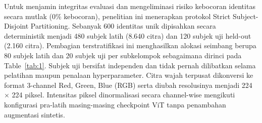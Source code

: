 Untuk menjamin integritas evaluasi dan mengeliminasi risiko kebocoran identitas secara mutlak (0\% kebocoran), penelitian ini menerapkan protokol Strict Subject-Disjoint Partitioning. Sebanyak 600 identitas unik dipisahkan secara deterministik menjadi 480 subjek latih (8.640 citra) dan 120 subjek uji held-out (2.160 citra). Pembagian terstratifikasi ini menghasilkan alokasi seimbang berupa 80 subjek latih dan 20 subjek uji per subkelompok sebagaimana dirinci pada Table~\ref{tab:1}. Subjek uji bersifat independen dan tidak pernah dilibatkan selama pelatihan maupun penalaan hyperparameter. Citra wajah terpusat dikonversi ke format 3-channel Red, Green, Blue (RGB) serta diubah resolusinya menjadi 224 $\times$ 224 piksel. Intensitas piksel dinormalisasi secara channel-wise mengikuti konfigurasi pra-latih masing-masing checkpoint ViT tanpa penambahan augmentasi sintetis.
